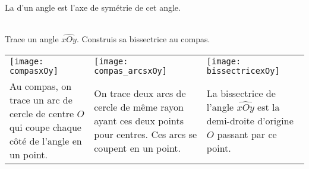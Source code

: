 
\begin{methode*1}

\begin{aconnaitre}
La \textbf{} d'un angle est l'axe de symétrie de cet angle.
\end{aconnaitre}

\begin{exemple*1} \\[0.75em]
Trace un angle $\widehat{xOy}$. Construis sa bissectrice au compas. \\[0.5em]

\begin{tabularx}{\textwidth}{X|X|X}
 \texttt{[image: compasxOy]} &  \texttt{[image: compas\_arcsxOy]} & \texttt{[image: bissectricexOy]} \\ 
Au compas, on trace un arc de cercle de centre $O$ qui coupe chaque côté de l'angle en un point. & On trace deux arcs de cercle de même rayon ayant ces deux points pour centres. Ces arcs se coupent en un point. & La bissectrice de l'angle $\widehat{xOy}$ est la demi-droite d'origine $O$ passant par ce point. \\
\end{tabularx} \\

 \end{exemple*1}

\exercice %



 
\end{methode*1}


